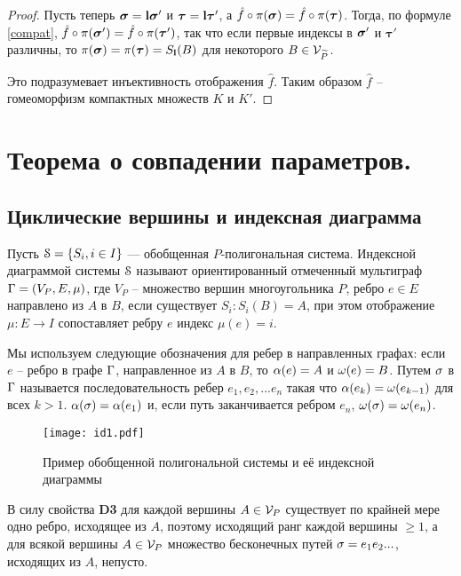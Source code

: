\begin{proof}
Пусть теперь  $\bm{\sigma}={\bf{l}}\bm{\sigma}'$ и $\bm\tau={\bf{l}}\bm\tau'$, а $\hat f\circ\pi(\bm{\sigma})=\hat f\circ\pi(\bm\tau)$. Тогда, по формуле \ref{compat}, $\hat f\circ\pi(\bm{\sigma}')=\hat f\circ\pi(\bm\tau')$, так что если первые индексы в $\bm{\sigma}'$ и  $\bm\tau'$ различны, то $\pi(\bm{\sigma})=\pi(\bm\tau)=S_{\bf{l}}(B)$ для некоторого $B\in {\mathcal V}_{\widetilde P}$. 
 
Это подразумевает инъективность отображения $\hat f$. Таким образом $\hat f$ -- гомеоморфизм компактных множеств $K$ и $K'$.   
\end{proof}
 


\section{Теорема о совпадении параметров.}

\subsection{Циклические вершины и индексная диаграмма}

\begin{definition}\label{cyclic}
Пусть ${\EuScript S}=\{S_i, i\in I\}$ --- обобщенная $P$-полигональная система. Индексной диаграммой системы ${\EuScript S}$ называют ориентированный отмеченный мультиграф $\Gamma=(V_P,E,\mu)$, где $V_P$ -- множество вершин многоугольника $P$, ребро $e\in E$ направлено из $A$ в $B$, если существует $S_i: S_i(B)=A$, при этом отображение $\mu:E\to I$ сопоставляет ребру  $e$  индекс  $\mu(e)=i$.
\end{definition}

Мы используем следующие обозначения для ребер в направленных графах: если $e$ -- ребро в графе $\Gamma$,  направленное из $A$ в $B$, то $\alpha(e)=A$ и $\omega(e)=B$. Путем $\sigma$ в $\Gamma$ называется последовательность ребер $e_1, e_2, ... e_n$ такая что $\alpha(e_k)=\omega(e_{k-1})$ для всех $k>1$. $\alpha(\sigma)=\alpha(e_1)$ и, если путь заканчивается ребром $e_n$, $\omega(\sigma)=\omega(e_n)$.\\

\begin{figure}[H]
    \centering
    \texttt{[image: id1.pdf]}
    \caption{Пример обобщенной полигональной системы и её индексной диаграммы}
    \label{img:id1}
\end{figure}

В силу свойства {\bf D3} для каждой вершины $A\in{\mathcal V}_P$ существует по крайней мере одно ребро, исходящее из $A$, поэтому исходящий ранг каждой вершины $\ge 1$, а для всякой вершины $A\in{\mathcal V}_P$
множество бесконечных путей $\sigma=e_1e_2...$, исходящих из $A$, непусто.

